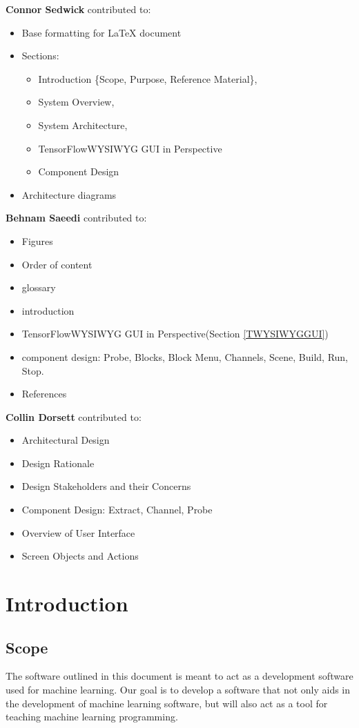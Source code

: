\documentclass[journal,10pt,onecolumn,compsoc]{IEEEtran} \usepackage[margin=1.0in]{geometry} \usepackage{pdfpages}
\begin{document}
\noindent\textbf{Connor Sedwick} contributed to: 
\begin{itemize}
	\item Base formatting for LaTeX document
	\item Sections: 
    \begin{itemize}
    \item Introduction \{Scope, Purpose, Reference Material\}, 
    \item System Overview, 
    \item System Architecture, 
    \item TensorFlow\texttrademark WYSIWYG GUI in Perspective
    \item Component Design
    \end{itemize}
    \item Architecture diagrams
\end{itemize}
\noindent\textbf{Behnam Saeedi} contributed to:
\begin{itemize}
	\item Figures
    \item Order of content
    \item glossary
    \item introduction
    \item TensorFlow\texttrademark WYSIWYG GUI in Perspective(Section \ref{TWYSIWYGGUI})
    \item component design: Probe, Blocks, Block Menu, Channels, Scene, Build, Run, Stop.
    \item References
\end{itemize}
\noindent\textbf{Collin Dorsett} contributed to:
\begin{itemize}
  \item Architectural Design
  \item Design Rationale
  \item Design Stakeholders and their Concerns
  \item Component Design: Extract, Channel, Probe
  \item Overview of User Interface
  \item Screen Objects and Actions
\end{itemize}

\newpage


\section{Introduction}
\subsection{Scope}
The software outlined in this document is meant to act as a development software used for machine learning.
Our goal is to develop a software that not only aids in the development of machine learning software, but will also act as a tool for teaching machine learning programming.
\end{document}
